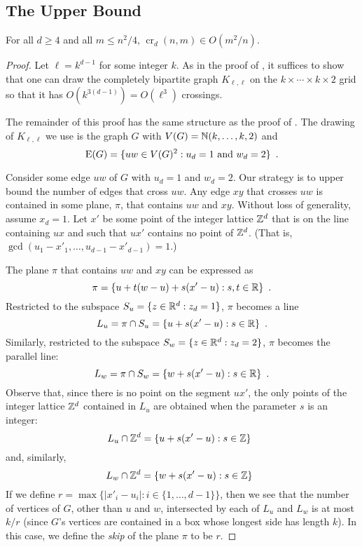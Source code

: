 \documentclass{patmorin}
\DeclareMathOperator{\crs}{cr}
\begin{document}
\subsection{The Upper Bound}

\begin{thm}
  For all $d\ge 4$ and all $m\le n^2/4$, $\crs_d(n,m)\in O(m^2/n)$.
\end{thm}

\begin{proof}
  Let $\ell=k^{d-1}$ for some integer $k$.  As in the proof of
  , it suffices to show that one can draw the
  completely bipartite graph $K_{\ell,\ell}$ on the $k\times\cdots\times
  k\times 2$ grid so that it has $O(k^{3(d-1)})=O(\ell^3)$ crossings.

  The remainder of this proof has the same structure as the proof of
  .  The drawing of $K_{\ell,\ell}$ we use is the graph
  $G$ with $V(G)=\mathbb{N}(k,\ldots,k,2)$ and
  \[
    \mathrm{E}(G) = \{ uw\in V(G)^2 :\mbox{$u_d = 1$ and $w_d = 2$} \} \enspace .
  \]
  
  Consider some edge $uw$ of $G$ with $u_d=1$ and $w_d=2$.  Our strategy
  is to upper bound the number of edges that cross $uw$.  Any edge $xy$
  that crosses $uw$ is contained in some plane, $\pi$, that contains $uw$
  and $xy$.  Without loss of generality, assume $x_d=1$.  Let $x'$ be some
  point of the integer lattice $\mathbb{Z}^d$ that is on the line containing
  $ux$ and such that $ux'$ contains no point of $\mathbb{Z}^d$. (That is,
  $\gcd(u_1-x'_1,\ldots,u_{d-1}-x'_{d-1}) = 1$.)

  The plane $\pi$ that contains $uw$ and $xy$ can be expressed as
  \[
     \pi = \{ u + t(w-u) + s(x'-u) : s,t\in\mathbb{R}\} \enspace .
  \]
  Restricted to the subspace $S_u=\{z\in\mathbb{R}^d: z_d=1\}$, $\pi$
  becomes a line
  \[
     L_u = \pi\cap S_u = \{ u + s(x'-u) : s\in\mathbb{R}\} \enspace .
  \]
  Similarly, restricted to the subspace $S_w=\{z\in\mathbb{R}^d: z_d=2\}$,
  $\pi$ becomes the parallel line:
  \[
     L_w = \pi\cap S_w = \{ w + s(x'-u) : s\in\mathbb{R}\} \enspace .
  \]
  Observe that, since there is no point on the segment $ux'$, the only
  points of the integer lattice $\mathbb{Z}^d$ contained in $L_u$ are obtained
  when the parameter $s$ is an integer:
  \[
     L_u\cap\mathbb{Z}^d = \{ u + s(x'-u) : s\in\mathbb{Z}\} \enspace 
  \]
  and, similarly,
  \[
     L_w\cap\mathbb{Z}^d = \{ w + s(x'-u) : s\in\mathbb{Z}\} \enspace 
  \]
  If we define $r=\max\{|x'_i-u_i| : i\in\{1,\ldots,d-1\}\}$, then we see
  that the number of vertices of $G$, other than $u$ and $w$, intersected
  by each of $L_u$ and $L_w$ is at most $k/r$ (since $G$'s vertices are
  contained in a box whose longest side has length $k$).  In this case,
  we define the \emph{skip} of the plane $\pi$ to be $r$.
  

\end{proof}
\end{document}
